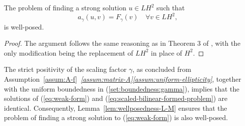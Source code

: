\documentclass[final,onefignum,onetabnum]{mousaviart}
\begin{document}
		
		\vspace*{1mm}
	\begin{lemma}
		\label{lem:wellposedness-L-M}
		The problem of finding a strong solution $u \in LH^2$ such that
		\begin{equation}
			\label{eq:scaled-bilinear-formed-problem}
			a_{\gamma}(u, v)= F_{\gamma}(v) \quad \forall v \in LH^2,
		\end{equation}
		is well-posed.
	\end{lemma}
	
	\vspace*{1mm}
	\begin{proof}
		The argument follows the same reasoning as in Theorem 3 of \cite{Smears-Suli}, with the only modification being the replacement of $LH^2$ in place of $H^2$.
	\end{proof}
	
	\vspace*{1mm}
	\begin{remark}
		The strict positivity of the scaling factor $\gamma$, as concluded from Assumption~\ref{assum:A-f}~\textit{\ref{assum:matrix-A}\ref{assum:uniform-ellipticity}}, together with the uniform boundedness in (\ref{set:boundedness:gamma}), implies that the solutions of (\ref{eq:weak-form}) and  (\ref{eq:scaled-bilinear-formed-problem}) are identical. Consequently, Lemma~\ref{lem:wellposedness-L-M} ensures that the problem of finding a strong solution to (\ref{eq:weak-form}) is also well-posed.
	\end{remark}	
	
\end{document}
